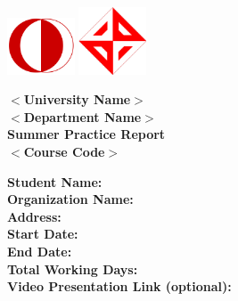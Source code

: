 \documentclass{scrreprt}
\begin{document}
\includegraphics[width=2cm]{metu.png}
\hfill
\includegraphics[width=2cm]{ceng.png}

\begin{center}
    {\bfseries
        \Huge{$<$University Name$>$\\ $<$Department Name$>$}\\
        \vspace{1.6cm}
        Summer Practice Report\\
        $<$Course Code$>$\\
        \vspace{3.6cm}
    }
\end{center}

\begin{flushleft}
    {\bfseries
        \large{Student Name: }\\
        \vspace{0.25cm}
        Organization Name: \\
        \vspace{0.25cm}
        Address: \\
        \vspace{0.25cm}
        Start Date: \\
        \vspace{0.25cm}
        End Date: \\
        \vspace{0.25cm}
        Total Working Days: \\
        \vspace{0.25cm}
        Video Presentation Link (optional): \\
    }
\end{flushleft}

\tableofcontents







\end{document}
